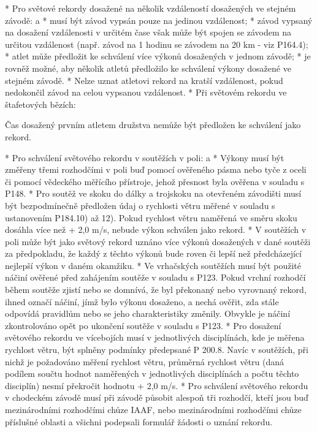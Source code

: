   \enditems
* Pro světové rekordy dosažené na několik vzdáleností dosažených ve stejném závodě:
  \begitems \style a
  * musí být závod vypsán pouze na jedinou vzdálenost;
  * závod vypsaný na dosažení vzdálenosti v určitém čase však může být spojen se závodem na určitou vzdálenost (např. závod na 1 hodinu se závodem na 20 km - viz P164.4);
  * atlet může předložit ke schválení více výkonů dosažených v jednom závodě;
  * je rovněž možné, aby několik atletů předložilo ke schválení výkony dosažené ve stejném závodě.
  * Nelze uznat atletovi rekord na kratší vzdálenost, pokud nedokončil závod na celou vypsanou vzdálenost.
  \enditems
* Při světovém rekordu ve štafetových bězích:

Čas dosažený prvním atletem družstva nemůže být předložen ke schválení jako rekord.

* Pro schválení světového rekordu v soutěžích v poli:
  \begitems \style a
  * Výkony musí být změřeny třemi rozhodčími v poli buď pomocí ověřeného pásma nebo tyče z oceli či pomocí vědeckého měřícího přístroje, jehož přesnost byla ověřena v souladu s P148.
  * Pro soutěž ve skoku do dálky a trojskoku na otevřeném závodišti musí být bezpodmínečně předložen údaj o rychlosti větru měřené v souladu s ustanovením P184.10) až 12). Pokud rychlost větru naměřená ve směru skoku dosáhla více než + 2,0 m/s, nebude výkon schválen jako rekord.
  * V soutěžích v poli může být jako světový rekord uznáno více výkonů dosažených v dané soutěži za předpokladu, že každý z těchto výkonů bude roven či lepší než předcházející nejlepší výkon v daném okamžiku.
  * Ve vrhačských soutěžích musí být použité náčiní ověřené před zahájením soutěže v souladu s P123. Pokud vrchní rozhodčí během soutěže zjistí nebo se domnívá, že byl překonaný nebo vyrovnaný rekord, ihned označí náčiní, jímž bylo výkonu dosaženo, a nechá ověřit, zda stále odpovídá pravidlům nebo se jeho charakteristiky změnily. Obvykle je náčiní zkontrolováno opět po ukončení soutěže v souladu s P123.
  \enditems
* Pro dosažení světového rekordu ve vícebojích musí v jednotlivých disciplínách, kde je měřena rychlost větru, být splněny podmínky předepsané P 200.8. Navíc v soutěžích, při nichž je požadováno měření rychlost větru, průměrná rychlost větru (daná podílem součtu hodnot naměřených v jednotlivých disciplínách a počtu těchto disciplín) nesmí překročit hodnotu + 2,0 m/s.
* Pro schválení světového rekordu v chodeckém závodě musí při závodě působit alespoň tři rozhodčí, kteří jsou buď mezinárodními rozhodčími chůze IAAF, nebo mezinárodními rozhodčími chůze příslušné oblasti a všichni podepsali formulář žádosti o uznání rekordu.
